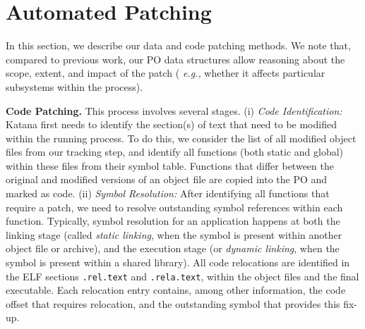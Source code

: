 \section{Automated Patching}

In this section, we describe our data and code patching methods.  We
note that, compared to previous work, our PO data structures
allow reasoning about the scope, extent, and impact of the patch ({\it
 e.g.,} whether it affects particular subsystems within the process).

{\bf Code Patching.} %
This process involves several stages.
\newline
(i) {\it Code Identification:} Katana first needs to identify the
section(s) of text that need to be modified within the running
process. To do this, we consider the list of all modified object files
from our tracking step, and identify all functions (both static and
global) within these files 
from their symbol table. 
Functions that differ between the original
and modified versions of an object file are copied into the PO and
marked as code.
\newline
(ii) {\it Symbol Resolution:} After identifying all functions that
require a patch, we need to resolve outstanding symbol references
within each function. Typically, symbol resolution for an application
happens at both the linking stage (called {\it static linking}, when
the symbol is present within another object file or archive), and the
execution stage (or {\it dynamic linking}, when the symbol is present
within a shared library).  All code relocations are identified in the
ELF sections {\tt .rel.text} and {\tt .rela.text}, within the object
files and the final executable.  Each relocation entry contains, among
other information, the code offset that requires relocation, and the
outstanding symbol that provides this fix-up.

